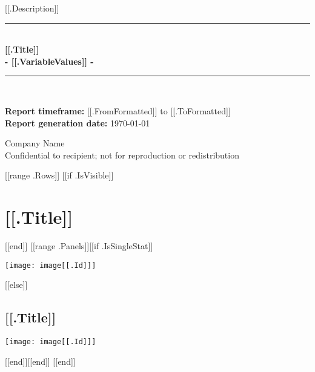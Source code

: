 \documentclass{article}
\begin{document}
\begin{titlepage}
\begin{flushright}
\end{flushright}

\center
\newcommand{\HRule}{\rule{\linewidth}{0.5mm}}

\textsf{\large [[.Description]]}\\[0.5cm]
\HRule \\[0.4cm]
{ \huge \bfseries [[.Title]]}\\[0.4cm]
{ \huge \bfseries - [[.VariableValues]] - }\\[0.4cm]
\HRule \\[1.5cm]

\begin{flushleft}
\large {\textbf{Report timeframe:} [[.FromFormatted]] to [[.ToFormatted]]}\\
\large {\textbf{Report generation date:} \today}\\[2cm]
\end{flushleft}

\vfill

\textsf{\LARGE Company Name}\\
\textsf{\large Confidential to recipient; not for reproduction or redistribution}\\

\end{titlepage}

\tableofcontents

\begin{center}

[[range .Rows]]
[[if .IsVisible]]
\newpage
\section{[[.Title]]}
[[end]]
[[range .Panels]][[if .IsSingleStat]]\begin{minipage}{0.3\textwidth}
\texttt{[image: image[[.Id]]]}
\end{minipage}
[[else]]\par
\subsection{[[.Title]]}
\vspace{0.5cm}
\texttt{[image: image[[.Id]]]}
\par
\vspace{0.5cm}[[end]][[end]]
[[end]]

\end{center}
\end{document}
